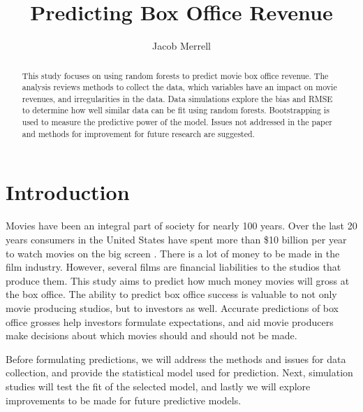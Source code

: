 \documentclass{svproc}
\begin{document}
\mainmatter              %
%
\title{Predicting Box Office Revenue}
%
%
\author{Jacob Merrell}
\institute{}
%

\maketitle              %

\begin{abstract}
This study focuses on using random forests to predict movie box office revenue. The analysis reviews methods to collect the data, which variables have an impact on movie revenues, and irregularities in the data. Data simulations explore the bias and RMSE to determine how well similar data can be fit using random forests. Bootstrapping is used to measure the predictive power of the model. Issues not addressed in the paper and methods for improvement for future research are suggested. 
\end{abstract}

\section{Introduction}

Movies have been an integral part of society for nearly 100 years. Over the last 20 years consumers in the United States have spent more than \$10 billion per year to watch movies on the big screen \cite{The Numbers}. There is a lot of money to be made in the film industry. However, several films are financial liabilities to the studios that produce them. This study aims to predict how much money movies will gross at the box office. The ability to predict box office success is valuable to not only movie producing studios, but to investors as well. Accurate predictions of box office grosses help investors formulate expectations, and aid movie producers make decisions about which movies should and should not be made.

Before formulating predictions, we will address the methods and issues for data collection, and provide the statistical model used for prediction. Next, simulation studies will test the fit of the selected model, and lastly we will explore improvements to be made for future predictive models.
\end{document}
